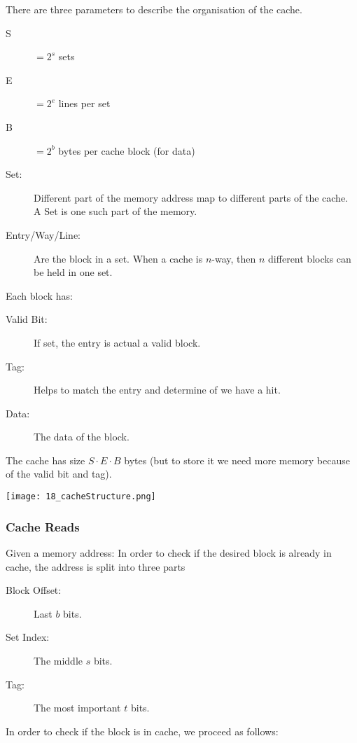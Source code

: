 There are three parameters to describe the organisation of the cache.

\begin{description}
    \item[S] $= 2^s$ sets
    \item[E] $= 2^e$ lines per set
    \item[B] $= 2^b$ bytes per cache block (for data)
\end{description}

\begin{description}
    \item[Set:] Different part of the memory address map to different parts of the cache. A Set is one such part of the memory.
    \item[Entry/Way/Line:] Are the block in a set. When a cache is $n$-way, then $n$ different blocks can be held in one set.
\end{description}

Each block has:

\begin{description}
    \item[Valid Bit:] If set, the entry is actual a valid block.
    \item[Tag:] Helps to match the entry and determine of we have a hit.
    \item[Data:] The data of the block.
\end{description}

The cache has size $S \cdot E \cdot B$ bytes (but to store it we need more memory because of the valid bit and tag).

\texttt{[image: 18\_cacheStructure.png]}

\subsubsection{Cache Reads}
Given a memory address: In order to check if the desired block is already in cache, the address is split into three parts

\begin{description}
    \item[Block Offset:] Last $b$ bits.
    \item[Set Index:] The middle $s$ bits.
    \item[Tag:] The most important $t$ bits.
\end{description}

In order to check if the block is in cache, we proceed as follows:

